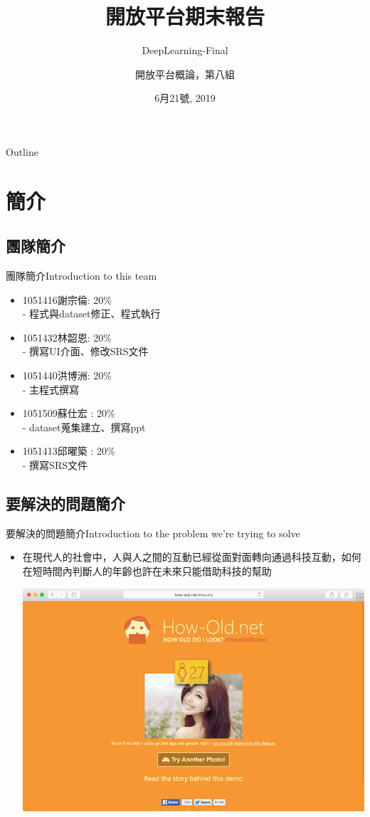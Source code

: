 \documentclass[utf8x]{beamer}
\title{開放平台期末報告}
\subtitle{DeepLearning-Final}
\author{開放平台概論，第八組}
\date{6月21號, 2019}
\begin{document}
\begin{frame}
  \titlepage
\end{frame}

\begin{frame}[shrink]{Outline}
  \tableofcontents
\end{frame}

\section{簡介}

\subsection{團隊簡介}

\begin{frame}{團隊簡介}{Introduction to this team }
  \begin{itemize}
  \item {
    1051416謝宗倫: 20\% \\
	 - 程式與dataset修正、程式執行
  }
  \item {
    1051432林韶恩: 20\% \\
	- 撰寫UI介面、修改SRS文件
  }
 \item {
    1051440洪博洲: 20\% \\
	- 主程式撰寫
  }
 \item {
    1051509蘇仕宏 : 20\% \\
	-  dataset蒐集建立、撰寫ppt
  }
 \item {
   1051413邱曜築 : 20\% \\
	 - 撰寫SRS文件
  }
  \end{itemize}
\end{frame}

\subsection{要解決的問題簡介}
\begin{frame}{要解決的問題簡介}{Introduction to the problem we're trying to solve}
  \begin{itemize}
  \item {
    在現代人的社會中，人與人之間的互動已經從面對面轉向通過科技互動，如何在短時間內判斷人的年齡也許在未來只能借助科技的幫助
\begin{minipage}[c][0.4\textheight][c]{\linewidth}
                \centering
                \includegraphics[width=0.5\linewidth]{how.png}
            \end{minipage}
  }
  \end{itemize}
\end{frame}
\end{document}
